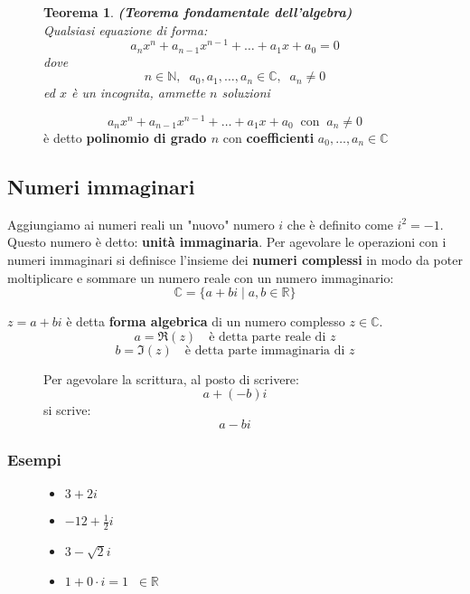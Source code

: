 \documentclass[a4paper]{article}
\newtheorem{theorem}{Teorema}
\theoremstyle{break}
\theoremstyle{break}
\theoremstyle{break}
\theoremstyle{break}
\begin{document}
\begin{figure}[H]
	\begin{theorem}
		\textbf{(Teorema fondamentale dell'algebra)}\\
		Qualsiasi equazione di forma:
		\[
			a_nx^n + a_{n-1}x^{n-1} + \ldots + a_1x + a_0 = 0
		\]
		dove
		\[
			n \in \mathbb{N},\;\; a_0, a_1, \ldots, a_n \in \mathbb{C},\;\; a_n \neq 0
		\]
		ed \( x \) è un incognita, ammette \( n \) soluzioni

	\end{theorem}

	\begin{define}
		\[
			a_nx^n + a_{n-1}x^{n-1} + \ldots + a_1x + a_0 \;\; \text{con} \;\; a_n \neq 0
		\]
		è detto \textbf{polinomio di grado \( n \)} con \textbf{coefficienti} \( a_0, \ldots, a_n \in \mathbb{C} \)
	\end{define}
\end{figure}

\subsection{Numeri immaginari}
Aggiungiamo ai numeri reali un "nuovo" numero $i$ che è definito come $i^2 = -1$. Questo numero
è detto: \textbf{unità immaginaria}. Per agevolare le operazioni con i numeri immaginari si
definisce l'insieme dei \textbf{numeri complessi} in modo da poter moltiplicare e sommare un
numero reale con un numero immaginario:
\[
	\mathbb{C} = \{ a + bi \;|\; a,b \in \mathbb{R} \}
\]

\( z = a + bi \) è detta \textbf{forma algebrica} di un numero complesso \( z \in \mathbb{C} \).
\[
	a = \Re(z) \quad \text{è detta parte reale di } z
\]
\[
	b = \Im(z) \quad \text{è detta parte immaginaria di } z
\]

\begin{figure}[H]
	\begin{define}
		Per agevolare la scrittura, al posto di scrivere:
		\[
			a + (-b)i
		\]
		si scrive:
		\[
			a - bi
		\]
	\end{define}
\end{figure}

\subsubsection{Esempi}
\begin{figure}[H]
	\begin{example}
		\begin{itemize}
			\item $3 + 2i$
			\item $-12 + \frac{1}{2}i$
			\item $3-\sqrt{2}i $
			\item $1+0 \cdot i = 1\;\; \in \mathbb{R}$
		\end{itemize}
	\end{example}
\end{figure}
\end{document}
